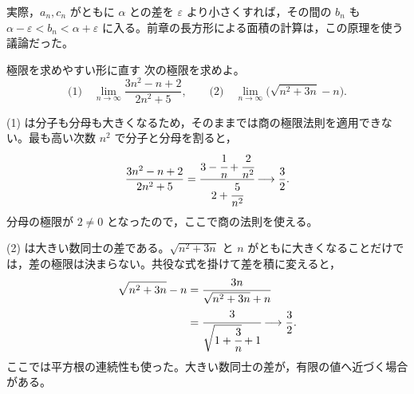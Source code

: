 実際，$a_n,c_n$ がともに $\alpha$ との差を $\varepsilon$ より小さくすれば，その間の $b_n$ も $\alpha-\varepsilon<b_n<\alpha+\varepsilon$ に入る。前章の長方形による面積の計算は，この原理を使う議論だった。

\begin{example}{極限を求めやすい形に直す}
次の極限を求めよ。
\[
 \text{(1)}\quad\lim_{n\to\infty}\frac{3n^2-n+2}{2n^2+5},
 \qquad
 \text{(2)}\quad\lim_{n\to\infty}\bigl(\sqrt{n^2+3n}-n\bigr).
\]
\end{example}
(1) は分子も分母も大きくなるため，そのままでは商の極限法則を適用できない。最も高い次数 $n^2$ で分子と分母を割ると，
\[
 \frac{3n^2-n+2}{2n^2+5}
 =\cfrac{3-\cfrac1n+\cfrac2{n^2}}{2+\cfrac5{n^2}}
 \longrightarrow\frac32.
\]
分母の極限が $2\ne0$ となったので，ここで商の法則を使える。

(2) は大きい数同士の差である。$\sqrt{n^2+3n}$ と $n$ がともに大きくなることだけでは，差の極限は決まらない。共役な式を掛けて差を積に変えると，
\begin{align*}
 \sqrt{n^2+3n}-n
 &=\frac{3n}{\sqrt{n^2+3n}+n}\\
 &=\cfrac3{\sqrt{1+\cfrac3n}+1}\longrightarrow\frac32.
\end{align*}
ここでは平方根の連続性も使った。大きい数同士の差が，有限の値へ近づく場合がある。

%
